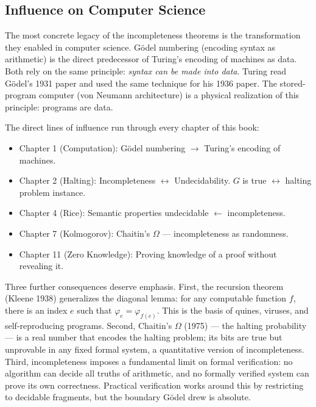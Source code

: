 \subsection{Influence on Computer Science}
\label{sec:godel:cs}

The most concrete legacy of the incompleteness theorems is the transformation they enabled in computer science. Gödel numbering (encoding syntax as arithmetic) is the direct predecessor of Turing's encoding of machines as data. Both rely on the same principle: \emph{syntax can be made into data}. Turing read Gödel's 1931 paper and used the same technique for his 1936 paper. The stored-program computer (von Neumann architecture) is a physical realization of this principle: programs are data.

The direct lines of influence run through every chapter of this book:

\begin{itemize}
\item Chapter 1 (Computation): Gödel numbering $\to$ Turing's encoding of machines.
\item Chapter 2 (Halting): Incompleteness $\leftrightarrow$ Undecidability. $G$ is true $\leftrightarrow$ halting problem instance.
\item Chapter 4 (Rice): Semantic properties undecidable $\leftarrow$ incompleteness.
\item Chapter 7 (Kolmogorov): Chaitin's $\Omega$ --- incompleteness as randomness.
\item Chapter 11 (Zero Knowledge): Proving knowledge of a proof without revealing it.
\end{itemize}

Three further consequences deserve emphasis. First, the recursion theorem (Kleene 1938) generalizes the diagonal lemma: for any computable function $f$, there is an index $e$ such that $\varphi_e = \varphi_{f(e)}$. This is the basis of quines, viruses, and self-reproducing programs. Second, Chaitin's $\Omega$ (1975) --- the halting probability --- is a real number that encodes the halting problem; its bits are true but unprovable in any fixed formal system, a quantitative version of incompleteness. Third, incompleteness imposes a fundamental limit on formal verification: no algorithm can decide all truths of arithmetic, and no formally verified system can prove its own correctness. Practical verification works around this by restricting to decidable fragments, but the boundary Gödel drew is absolute.


